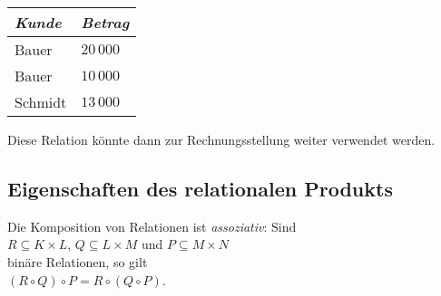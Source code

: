 \begin{center}
  \begin{tabular}[t]{|l|l|}
\hline
\textsl{Kunde} & \textsl{Betrag} \\
\hline
\hline
  Bauer   & $20\,000$ \\
\hline
  Bauer   & $10\,000$ \\
\hline
  Schmidt & $13\,000$ \\
\hline
  \end{tabular} 
\end{center}
Diese Relation k\"{o}nnte dann zur Rechnungsstellung weiter verwendet werden. \eox


\subsection{Eigenschaften des relationalen Produkts}
\begin{Satz}
  Die Komposition von Relationen ist \emph{assoziativ}:  Sind \\[0.2cm]
  \hspace*{1.3cm} 
  $R \subseteq K \times L$, \quad $Q \subseteq L \times M$ \quad und \quad 
  $P \subseteq M \times N$ \\[0.2cm]
  bin\"{a}re Relationen, so gilt \\[0.2cm]
  \hspace*{1.3cm} $(R \circ Q) \circ P = R \circ (Q \circ P)$. 
\end{Satz}
\pagebreak

